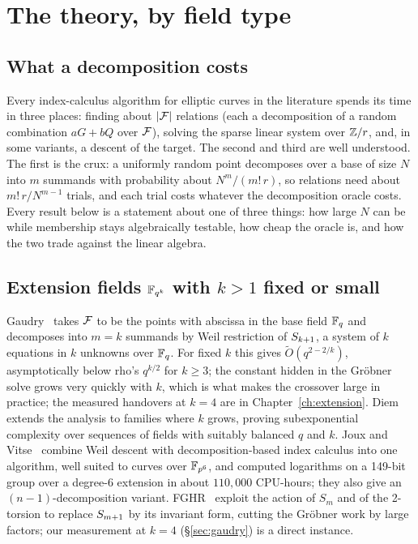 \chapter{The theory, by field type}\label{sec:theory}


\section{What a decomposition costs}

Every index-calculus algorithm for elliptic curves in the literature
spends its time in three places: finding about $\lvert \mathcal{F} \rvert$ relations (each
a decomposition of a random combination $aG+bQ$ over $\mathcal{F}$), solving the
sparse linear system over $\mathbb{Z}/r$, and, in some variants, a descent of
the target. The second and third are well understood. The first is the
crux: a uniformly random point decomposes over a base of size $N$ into $m$
summands with probability about $N^m/(m!\,r)$, so relations need about
$m!\,r/N^{m-1}$ trials, and each trial costs whatever the decomposition
oracle costs. Every result below is a statement about one of three things:
how large $N$ can be while membership stays algebraically testable, how
cheap the oracle is, and how the two trade against the linear algebra.

\section{Extension fields $\mathbb{F}_{q^k}$ with $k>1$ fixed or small}

Gaudry~\cite{gaudry2009} takes $\mathcal{F}$ to be the points with abscissa in the
base field $\mathbb{F}_q$ and decomposes into $m=k$ summands by Weil restriction of
$S_{k+1}$, a system of $k$ equations in $k$ unknowns over $\mathbb{F}_q$. For
fixed $k$ this gives $\tilde O(q^{2-2/k})$, asymptotically below rho's
$q^{k/2}$ for $k\ge3$; the constant hidden in the Gr\"obner solve grows
very quickly with $k$, which is what makes the crossover large in
practice; the measured handovers at $k=4$ are in Chapter~\ref{ch:extension}.
Diem~\cite{diem2011} extends the analysis to families where $k$ grows,
proving subexponential complexity over sequences of fields with suitably
balanced $q$ and $k$. Joux and Vitse~\cite{jouxvitse2012} combine Weil
descent with decomposition-based index calculus into one algorithm, well
suited to curves over $\mathbb{F}_{p^6}$, and computed logarithms on a 149-bit
group over a degree-6 extension in about $110{,}000$ CPU-hours; they also
give an $(n-1)$-decomposition variant. FGHR~\cite{fghr2014} exploit the action of $S_m$ and of
the 2-torsion to replace $S_{m+1}$ by its invariant form, cutting the
Gr\"obner work by large factors; our measurement at $k=4$
(\S\ref{sec:gaudry}) is a direct instance.

